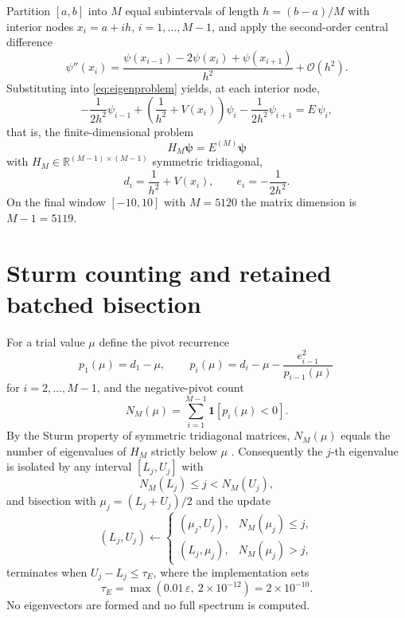 \documentclass[twocolumn,10pt,a4paper]{article}
\theoremstyle{plain}
\theoremstyle{definition}
\newcommand{\R}{\mathbb{R}}
\newcommand{\eps}{\varepsilon}
\begin{document}
Partition $[a,b]$ into $M$ equal subintervals of length $h = (b-a)/M$ with
interior nodes $x_{i} = a + ih$, $i = 1,\dots,M-1$, and apply the second-order
central difference
\begin{equation}
\psi''(x_{i}) = \frac{\psi(x_{i-1}) - 2\psi(x_{i}) + \psi(x_{i+1})}{h^{2}}
+ \mathcal{O}(h^{2}).
\end{equation}
Substituting into \eqref{eq:eigenproblem} yields, at each interior node,
\begin{equation}
-\frac{1}{2h^{2}}\psi_{i-1}
+ \left(\frac{1}{h^{2}} + V(x_{i})\right)\psi_{i}
- \frac{1}{2h^{2}}\psi_{i+1}
= E\,\psi_{i},
\end{equation}
that is, the finite-dimensional problem
\begin{equation}
\boxed{H_{M}\boldsymbol{\psi} = E^{(M)}\boldsymbol{\psi}}
\label{eq:discrete}
\end{equation}
with $H_{M}\in\R^{(M-1)\times(M-1)}$ symmetric tridiagonal,
\begin{equation}
d_{i} = \frac{1}{h^{2}} + V(x_{i}),
\qquad
e_{i} = -\frac{1}{2h^{2}} .
\label{eq:entries}
\end{equation}
On the final window $[-10,10]$ with $M = 5120$ the matrix dimension is
$M - 1 = 5119$.

\section{Sturm counting and retained batched bisection}
\label{sec:sturm}

For a trial value $\mu$ define the pivot recurrence
\begin{equation}
p_{1}(\mu) = d_{1} - \mu,
\qquad
\boxed{\,p_{i}(\mu) = d_{i} - \mu -
\frac{e_{i-1}^{2}}{p_{i-1}(\mu)}\,}
\label{eq:pivot}
\end{equation}
for $i = 2,\dots,M-1$, and the negative-pivot count
\begin{equation}
N_{M}(\mu) = \sum_{i=1}^{M-1}\mathbf{1}\!\left[p_{i}(\mu) < 0\right].
\label{eq:count}
\end{equation}
By the Sturm property of symmetric tridiagonal matrices, $N_{M}(\mu)$ equals the
number of eigenvalues of $H_{M}$ strictly below $\mu$
\citep{wilkinson1965,parlett1998}. Consequently the $j$-th eigenvalue is
isolated by any interval $[L_{j},U_{j}]$ with
\begin{equation}
N_{M}(L_{j}) \le j < N_{M}(U_{j}),
\end{equation}
and bisection with $\mu_{j} = (L_{j}+U_{j})/2$ and the update
\begin{equation}
(L_{j},U_{j}) \leftarrow
\begin{cases}
(\mu_{j},U_{j}), & N_{M}(\mu_{j}) \le j,\\[3pt]
(L_{j},\mu_{j}), & N_{M}(\mu_{j}) > j,
\end{cases}
\end{equation}
terminates when $U_{j} - L_{j} \le \tau_{E}$, where the implementation sets
\begin{equation}
\tau_{E} = \max\!\left(0.01\,\eps,\ 2\times10^{-12}\right)
= 2\times10^{-10} .
\end{equation}
No eigenvectors are formed and no full spectrum is computed.
\end{document}
